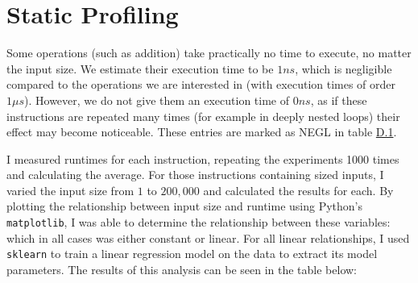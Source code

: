 \label{sec:D}

\section*{Static Profiling}

Some operations (such as addition) take practically no time to execute, no matter the input size. We estimate their execution time to be \( 1 ns \), which is negligible compared to the operations we are interested in (with execution times of order \( 1 \mu s \)). However, we do not give them an execution time of \( 0 ns \), as if these instructions are repeated many times (for example in deeply nested loops) their effect may become noticeable. These entries are marked as NEGL in table \hyperref[table:runtime]{D.1}.

I measured runtimes for each instruction, repeating the experiments 1000 times and calculating the average. For those instructions containing sized inputs, I varied the input size from \( 1 \) to \( 200,000 \) and calculated the results for each. By plotting the relationship between input size and runtime using Python's \texttt{matplotlib}, I was able to determine the relationship between these variables: which in all cases was either constant or linear. For all linear relationships, I used \texttt{sklearn} to train a linear regression model on the data to extract its model parameters. The results of this analysis can be seen in the table below: 

\vspace{3mm}

